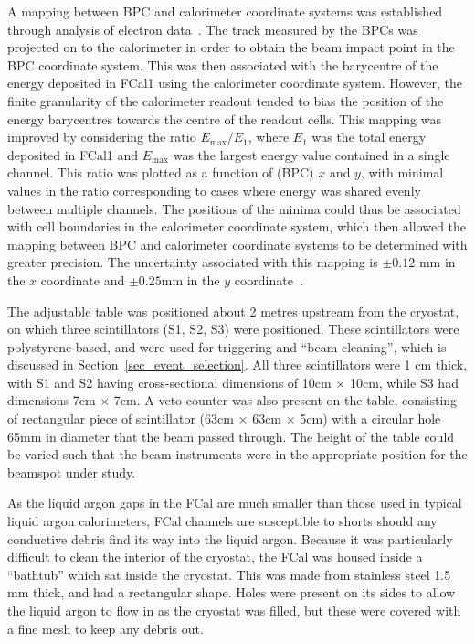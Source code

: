 A mapping between BPC and calorimeter coordinate systems was established through analysis of electron data~\cite{Fcalpaper}. The track measured by the BPCs was projected on to the calorimeter in order to obtain the beam impact point in the BPC coordinate system. This was then associated with the barycentre of the energy deposited in FCal1 using the calorimeter coordinate system. However, the finite granularity of the calorimeter readout tended to bias the position of the energy barycentres towards the centre of the readout cells. This mapping was improved by considering the ratio $E_\mathrm{max}/E_1$, where $E_1$ was the total energy deposited in FCal1 and $E_\mathrm{max}$ was the largest energy value contained in a single channel. This ratio was plotted as a function of (BPC) $x$ and $y$, with minimal values in the ratio corresponding to cases where energy was shared evenly between multiple channels. The positions of the minima could thus be associated with cell boundaries in the calorimeter coordinate system, which then allowed the mapping between BPC and calorimeter coordinate systems to be determined with greater precision. The uncertainty associated with this mapping is $\pm0.12$ mm in the $x$ coordinate and $\pm 0.25$mm in the $y$ coordinate~\cite{LouiseThesis}.
%
%





The adjustable table was positioned about 2 metres upstream from the cryostat, on which three scintillators (S1, S2, S3) were positioned. These scintillators were polystyrene-based, and were used for triggering and ``beam cleaning'', which is discussed in Section~\ref{sec_event_selection}. All three scintillators were 1 cm thick, with S1 and S2 having cross-sectional dimensions of 10cm $\times$ 10cm, while S3 had dimensions 7cm $\times$ 7cm. A veto counter was also present on the table, consisting of rectangular piece of scintillator (63cm $\times$ 63cm $\times$ 5cm) with a circular hole 65mm in diameter that the beam passed through. The height of the table could be varied such that the beam instruments were in the appropriate position for the beamspot under study. 

As the liquid argon gaps in the FCal are much smaller than those used in typical liquid argon calorimeters, FCal channels are susceptible to shorts should any conductive debris find its way into the liquid argon. Because it was particularly difficult to clean the interior of the cryostat, the FCal was housed inside a ``bathtub'' which sat inside the cryostat. This was made from stainless steel 1.5 mm thick, and had a rectangular shape. Holes were present on its sides to allow the liquid argon to flow in as the cryostat was filled, but these were covered with a fine mesh to keep any debris out. 

